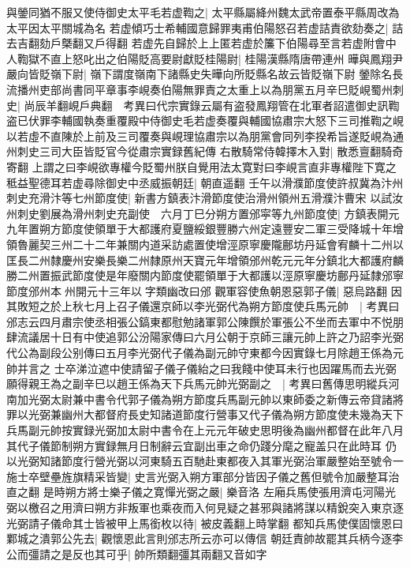 與鎣同猶不服又使侍御史太平毛若虚鞫之|{
	太平縣屬絳州魏太武帝置泰平縣周改為太平因太平關城為名}
若虚傾巧士希輔國意歸罪夷甫伯陽怒召若虚詰責欲劾奏之|{
	詰去吉翻劾戶槩翻又戶得翻}
若虚先自歸於上上匿若虚於簾下伯陽尋至言若虚附會中人鞫獄不直上怒叱出之伯陽貶高要尉獻貶桂陽尉|{
	桂陽漢縣隋唐帶連州}
曄與鳳翔尹嚴向皆貶嶺下尉|{
	嶺下謂度嶺南下諸縣史失曄向所貶縣名故云皆貶嶺下尉}
鎣除名長流播州吏部尚書同平章事李峴奏伯陽無罪責之太重上以為朋黨五月辛巳貶峴蜀州刺史|{
	尚辰羊翻峴戶典翻　考異曰代宗實錄云屬有盗發鳳翔管在北軍者詔遣御史訊鞫盗已伏罪李輔國執奏重覆殿中侍御史毛若虚奏覆與輔國協肅宗大怒下三司推鞫之峴以若虛不直陳於上前及三司覆奏與峴理協肅宗以為朋黨會同列李揆希旨遂貶峴為通州刺史三司大臣皆貶官今從肅宗實録舊紀傳}
右散騎常侍韓擇木入對|{
	散悉亶翻騎奇寄翻}
上謂之曰李峴欲專權今貶蜀州朕自覺用法太寛對曰李峴言直非專權陛下寛之秪益聖德耳若虚尋除御史中丞威振朝廷|{
	朝直遥翻}
壬午以滑濮節度使許叔冀為汴州刺史充滑汴等七州節度使|{
	新書方鎮表汴滑節度使治滑州領州五滑濮汴曹宋}
以試汝州刺史劉展為滑州刺史充副使　六月丁巳分朔方置邠寜等九州節度使|{
	方鎮表開元九年置朔方節度使領單于大都護府夏鹽綏銀豐勝六州定遠豐安二軍三受降城十年增領魯麗契三州二十二年兼關内道采訪處置使增涇原寧慶隴鄜坊丹延會宥麟十二州以匡長二州隸慶州安樂長樂二州隸原州天寶元年增領邠州乾元元年分鎮北大都護府麟勝二州置振武節度使是年廢關内節度使罷領單于大都護以涇原寧慶坊鄜丹延隸邠寧節度邠州本州開元十三年以字類幽改曰邠}
觀軍容使魚朝恩惡郭子儀|{
	惡烏路翻}
因其敗短之於上秋七月上召子儀還京師以李光弼代為朔方節度使兵馬元帥　|{
	考異曰邠志云四月肅宗使丞相張公鎬東都慰勉諸軍郭公陳饌於軍張公不坐而去軍中不悦朋肆流議居十日有中使追郭公汾陽家傳曰六月公朝于京師三讓元帥上許之乃詔李光弼代公為副段公别傳曰五月李光弼代子儀為副元帥守東都今因實錄七月除趙王係為元帥并言之}
士卒涕泣遮中使請留子儀子儀紿之曰我餞中使耳未行也因躍馬而去光弼願得親王為之副辛巳以趙王係為天下兵馬元帥光弼副之　|{
	考異曰舊傳思明縱兵河南加光弼太尉兼中書令代郭子儀為朔方節度兵馬副元帥以東師委之新傳云帝貸諸將罪以光弼兼幽州大都督府長史知諸道節度行營事又代子儀為朔方節度使未幾為天下兵馬副元帥按實録光弼加太尉中書令在上元元年破史思明後為幽州都督在此年八月其代子儀節制朔方實録無月日制辭云宜副出車之命仍踐分麾之寵盖只在此時耳}
仍以光弼知諸節度行營光弼以河東騎五百馳赴東都夜入其軍光弼治軍嚴整始至號令一施士卒壁壘旌旗精采皆變|{
	史言光弼入朔方軍部分皆因子儀之舊但號令加嚴整耳治直之翻}
是時朔方將士樂子儀之寛憚光弼之嚴|{
	樂音洛}
左廂兵馬使張用濟屯河陽光弼以檄召之用濟曰朔方非叛軍也乘夜而入何見疑之甚邪與諸將謀以精銳突入東京逐光弼請子儀命其士皆被甲上馬銜枚以待|{
	被皮義翻上時掌翻}
都知兵馬使僕固懷恩曰鄴城之潰郭公先去|{
	觀懷恩此言則邠志所云亦可以傳信}
朝廷責帥故罷其兵柄今逐李公而彊請之是反也其可乎|{
	帥所類翻彊其兩翻又音如字}
